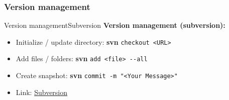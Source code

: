 


\subsubsection{Version management}
\begin{frame}{Version management}{Subversion}
  \textbf{Version management (subversion):}
  \begin{itemize}
    \item
      Initialize / update directory: \textbf{svn} \texttt{checkout <URL>}
    \item
      Add files / folders: \textbf{svn} \texttt{add <file> -{}-all}
    \item
      Create snapshot: \textbf{svn} \texttt{commit -m "<Your Message>"}
    \item
      Link: {\color{MainA}\href{\LectureSubversionLink}{Subversion}}
  \end{itemize}
\end{frame}


